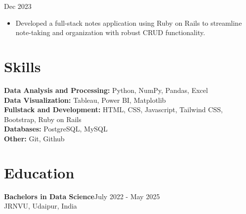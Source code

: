 \documentclass[letterpaper, 10pt]{article}
\newcommand{\secStartSpace}{\vspace{3pt}}
\newcommand{\secEndSpace}{\vspace{5pt}}
\newcommand{\projectHeader}[2]{
\noindent{\large\textbf{#1}} \hfill \normalsize#2 \vspace{2pt}
}
\begin{document}
\begin{addmargin}[0.5em]{1em}
        \projectHeader{WRITEMIND}{Dec 2023}
        \begin{itemize}
            \item Developed a full-stack notes application using Ruby on Rails to streamline note-taking and organization with robust CRUD functionality.

        \end{itemize}
    \vspace{8pt}
\end{addmargin}
\secEndSpace
\secEndSpace


\section{\color{black} \textbf{Skills}}
\secStartSpace

\begin{addmargin}[0.5em]{1em}
	\noindent \textbf{Data Analysis and Processing:} Python, NumPy, Pandas, Excel \\
        \noindent \textbf{Data Visualization:} Tableau, Power BI, Matplotlib \\
        \noindent \textbf{Fullstack and Development:} HTML, CSS, Javascript, Tailwind CSS, Bootstrap, Ruby on Rails \\
        \noindent \textbf{Databases:} PostgreSQL, MySQL \\
        \noindent \textbf{Other:} Git, Github \\
\end{addmargin}
\secEndSpace
\secEndSpace


\section{\color{black} \textbf{Education}}
\secStartSpace

\begin{addmargin}[0.5em]{1em}
	\large\textbf{Bachelors in Data Science}\hfill \normalsize{July 2022 - May 2025}\\
	\setlength\parindent{1cm} JRNVU, Udaipur, India
\end{addmargin}
\secEndSpace
\secEndSpace


\end{document}
